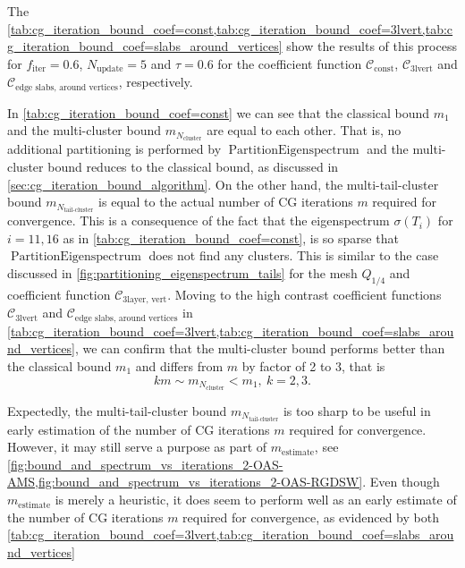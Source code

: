 The \cref{tab:cg_iteration_bound_coef=const,tab:cg_iteration_bound_coef=3lvert,tab:cg_iteration_bound_coef=slabs_around_vertices} show the results of this process for $f_{\text{iter}} = 0.6$, $N_{\text{update}} = 5$ and $\tau = 0.6$ for the coefficient function $\mathcal{C}_{\text{const}}$, $\mathcal{C}_{\text{3lvert}}$ and $\mathcal{C}_{\text{edge slabs, around vertices}}$, respectively.



In \cref{tab:cg_iteration_bound_coef=const} we can see that the classical bound $m_1$ and the multi-cluster bound $m_{N_{\text{cluster}}}$ are equal to each other. That is, no additional partitioning is performed by $\operatorname{PartitionEigenspectrum}$ and the multi-cluster bound reduces to the classical bound, as discussed in \cref{sec:cg_iteration_bound_algorithm}. 
On the other hand, the multi-tail-cluster bound $m_{N_{\text{tail-cluster}}}$ is equal to the actual number of CG iterations $m$ required for convergence. This is a consequence of the fact that the eigenspectrum $\sigma(T_{i})$ for $i=11,16$ as in \cref{tab:cg_iteration_bound_coef=const}, is so sparse that $\operatorname{PartitionEigenspectrum}$ does not find any clusters. This is similar to the case discussed in \cref{fig:partitioning_eigenspectrum_tails} for the mesh $Q_{1/4}$ and coefficient function $\mathcal{C}_{\text{3layer, vert}}$.
Moving to the high contrast coefficient functions $\mathcal{C}_{\text{3lvert}}$ and $\mathcal{C}_{\text{edge slabs, around vertices}}$ in \cref{tab:cg_iteration_bound_coef=3lvert,tab:cg_iteration_bound_coef=slabs_around_vertices}, we can confirm that the multi-cluster bound performs better than the classical bound $m_1$ and differs from $m$ by factor of 2 to 3, that is  
\begin{equation}
    km \sim m_{N_{\text{cluster}}} < m_1, \ k = 2,3.
    \label{eq:multi_cluster_bound_factor}
\end{equation}

Expectedly, the multi-tail-cluster bound $m_{N_{\text{tail-cluster}}}$ is too sharp to be useful in early estimation of the number of CG iterations $m$ required for convergence. However, it may still serve a purpose as part of $m_{\text{estimate}}$, see \cref{fig:bound_and_spectrum_vs_iterations_2-OAS-AMS,fig:bound_and_spectrum_vs_iterations_2-OAS-RGDSW}. Even though $m_{\text{estimate}}$ is merely a heuristic, it does seem to perform well as an early estimate of the number of CG iterations $m$ required for convergence, as evidenced by both \cref{tab:cg_iteration_bound_coef=3lvert,tab:cg_iteration_bound_coef=slabs_around_vertices}

